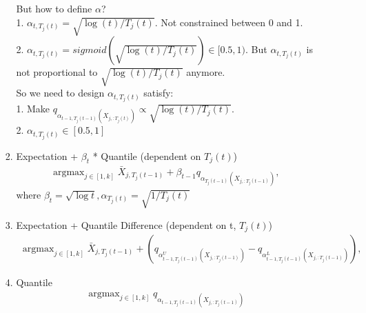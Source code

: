 \documentclass{article}
\DeclareMathOperator*{\argmax}{argmax}
\begin{document}
\begin{enumerate}
\begin{enumerate}
\begin{enumerate}
        But how to define $\alpha$?\\
        1. $\alpha_{t, T_j(t)} = \sqrt{\log(t)/T_j(t)}$. Not constrained between 0 and 1.\\
        2. $\alpha_{t, T_j(t)} = sigmoid (\sqrt{\log(t)/T_j(t)}) \in [0.5, 1)$. But $\alpha_{t, T_j(t)}$ is not proportional to $\sqrt{\log(t)/T_j(t)}$ anymore.\\
        
        So we need to design $\alpha_{t, T_j(t)}$ satisfy:\\
        1. Make $q_{\alpha_{t-1, T_j(t-1)}(X_{j,:T_j(t)})} \varpropto \sqrt{\log(t)/T_j(t)}$.\\
        2. $\alpha_{t, T_j(t)} \in [0.5, 1]$
        
            
        \item Expectation + $\beta_t$ * Quantile (dependent on $T_j(t)$)\\
            \begin{align}
            \argmax_{j \in [1,k]} \bar{X}_{j,T_j(t-1)} + \beta_{t-1} q_{\alpha_{T_j(t-1)}(X_{j,:T_j(t-1)})},
            \end{align}
            where $\beta_t = \sqrt{\log t}, \alpha_{T_j(t)} = \sqrt{1/T_j(t)}$
        \item Expectation + Quantile Difference (dependent on t, $T_j(t)$)
        \begin{align}
        \argmax_{j \in [1,k]} \bar{X}_{j,T_j(t-1)} + (q_{\alpha^U_{t-1, T_j(t-1)}(X_{j,:T_j(t-1)})} - q_{\alpha^L_{t-1, T_j(t-1)}(X_{j,:T_j(t-1)})}),
        \end{align}
        \item Quantile 
            \begin{align}
            \argmax_{j \in [1,k]} q_{\alpha_{t-1, T_j(t-1)}(X_{j,:T_j(t-1)})}
            \end{align}
        \end{enumerate}
        
    \end{enumerate}


\end{enumerate}
\end{document}
